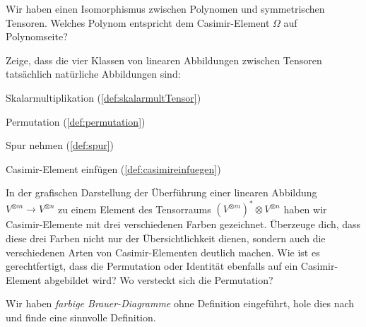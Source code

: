 \begin{sheet}

\begin{problem}[title={Casimir-Element der Polynome}]
Wir haben einen Isomorphismus zwischen Polynomen und symmetrischen Tensoren. Welches Polynom entspricht dem Casimir-Element $\Omega$ auf Polynomseite?
\end{problem}

\begin{problem}[title={Die 4 Klassen von linearen Tensor-Abbildungen sind natürlich}]
	\label{aufg:natAbbKlass}
	Zeige, dass die vier Klassen von linearen Abbildungen zwischen Tensoren tatsächlich natürliche Abbildungen sind:
	\begin{subproblem}
		Skalarmultiplikation (\ref{def:skalarmultTensor})
	\end{subproblem}
	\begin{subproblem}
		Permutation (\ref{def:permutation})
	\end{subproblem}
	\begin{subproblem}
		Spur nehmen (\ref{def:spur})
	\end{subproblem}
	\begin{subproblem}
		Casimir-Element einfügen (\ref{def:casimireinfuegen})
	\end{subproblem}
\end{problem}

\begin{problem}[title={Bunte Casimir-Elemente}]
	In der grafischen Darstellung der Überführung einer linearen Abbildung $V^{\otimes m} \to V^{\otimes n}$ zu einem Element des Tensorraums $\left(V^{\otimes m}\right)^\ast \otimes V^{\otimes n}$ haben wir Casimir-Elemente mit drei verschiedenen Farben gezeichnet. Überzeuge dich, dass diese drei Farben nicht nur der Übersichtlichkeit dienen, sondern auch die verschiedenen Arten von Casimir-Elementen deutlich machen. Wie ist es gerechtfertigt, dass die Permutation oder Identität ebenfalls auf ein Casimir-Element abgebildet wird? Wo versteckt sich die Permutation?
	
	Wir haben \emph{farbige Brauer-Diagramme} ohne Definition eingeführt, hole dies nach und finde eine sinnvolle Definition.
\end{problem}


\end{sheet}
